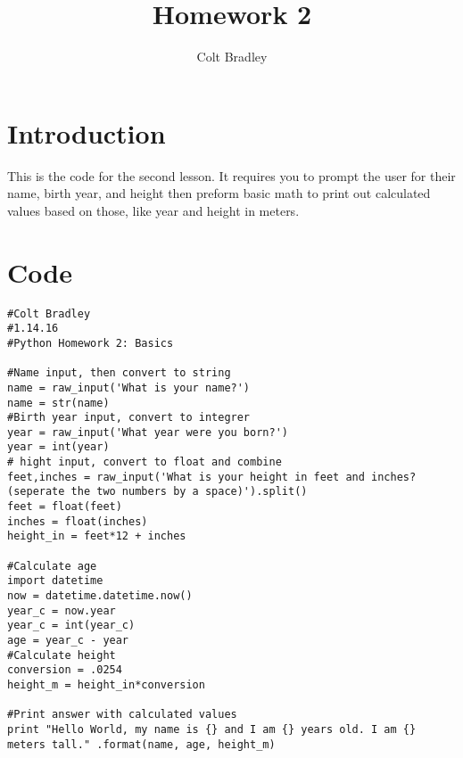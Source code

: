 \documentclass[11pt]{article}
\begin{document}
\title{Homework 2}
\date{}
\author{Colt Bradley}
\maketitle

\section{Introduction}
This is the code for the second lesson. It requires you to prompt the user for their name, birth year, and height then preform basic math to print out calculated values based on those, like year and height in meters. 

\section{Code}
\begin{verbatim}
#Colt Bradley
#1.14.16
#Python Homework 2: Basics

#Name input, then convert to string
name = raw_input('What is your name?')
name = str(name)
#Birth year input, convert to integrer
year = raw_input('What year were you born?')
year = int(year)
# hight input, convert to float and combine
feet,inches = raw_input('What is your height in feet and inches? (seperate the two numbers by a space)').split()
feet = float(feet)
inches = float(inches)
height_in = feet*12 + inches

#Calculate age
import datetime
now = datetime.datetime.now()
year_c = now.year
year_c = int(year_c)
age = year_c - year
#Calculate height
conversion = .0254
height_m = height_in*conversion

#Print answer with calculated values
print "Hello World, my name is {} and I am {} years old. I am {} meters tall." .format(name, age, height_m)
\end{verbatim}
\end{document}
